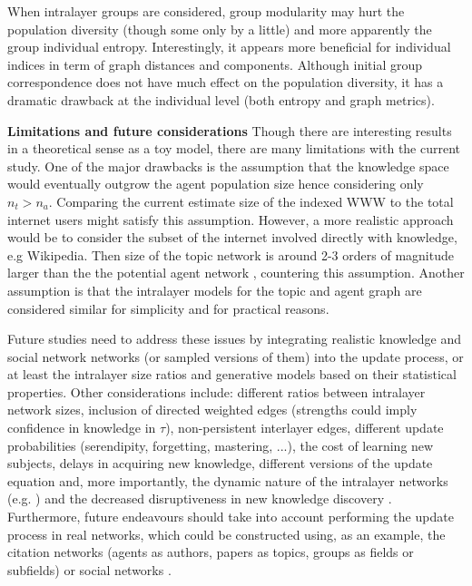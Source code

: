 \documentclass{svproc}
\begin{document}
When intralayer groups are considered, group modularity may hurt the population diversity (though some only by a little) and more apparently the group individual entropy.
Interestingly, it appears more beneficial for individual indices in term of graph distances and components.
Although initial group correspondence does not have much effect on the population diversity, it has a dramatic drawback at the individual level (both entropy and graph metrics).




\textbf{Limitations and future considerations}
Though there are interesting results in a theoretical sense as a toy model, there are many limitations with the current study.
    One of the major drawbacks is the assumption that the knowledge space would eventually outgrow the agent population size hence considering only $n_t > n_a$.
    Comparing the current estimate size of the indexed WWW \footnotemark[1] to the total internet users \footnotemark[2] might satisfy this assumption.
    However, a more realistic approach would be to consider the subset of the internet involved directly with knowledge, e.g Wikipedia. Then size of the topic network \footnotemark[3] is around 2-3 orders of magnitude larger than the the potential agent network \footnotemark[2], countering this assumption.
Another assumption is that the intralayer models for the topic and agent graph are considered similar for simplicity and for practical reasons.

Future studies need to address these issues
    by integrating realistic knowledge and social network networks (or sampled versions of them) into the update process,
    or at least the intralayer size ratios and generative models based on their statistical properties.
Other considerations include:
    different ratios between intralayer network sizes,
    inclusion of directed weighted edges (strengths could imply confidence in knowledge in $\tau$),
    non-persistent interlayer edges,
    different update probabilities (serendipity, forgetting, mastering, ...),
    the cost of learning new subjects,
    delays in acquiring new knowledge,
    different versions of the update equation and, more importantly,
    the dynamic nature of the intralayer networks (e.g. \cite{Sun2020-qj})
    and the decreased disruptiveness in new knowledge discovery \cite{Park2021-jb}.
Furthermore, future endeavours should take into account performing the update process in real networks,
    which could be constructed using, as an example, the citation networks (agents as authors, papers as topics, groups as fields or subfields) or social networks \cite{Weng2015-zt}.
\end{document}
